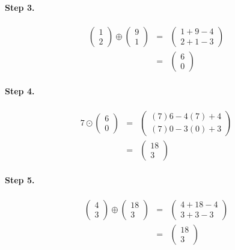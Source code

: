\documentclass[11pt]{article}
\begin{document}
\paragraph{Step 3.}
\begin{eqnarray*}
\begin{pmatrix}
1\\
2
\end{pmatrix}
\oplus
\begin{pmatrix}
9\\
1
\end{pmatrix}
&=&
\begin{pmatrix}
1+9-4\\
2+1-3
\end{pmatrix}
\\&=&
\begin{pmatrix}
6\\
0
\end{pmatrix}
\end{eqnarray*}
\paragraph{Step 4.}
\begin{eqnarray*}
7
\odot
\begin{pmatrix}
6\\
0
\end{pmatrix}
&=&
\begin{pmatrix}
(7)6-4(7)+4\\
(7)0-3(0)+3
\end{pmatrix}
\\&=&
\begin{pmatrix}
18\\
3
\end{pmatrix}
\end{eqnarray*}
\paragraph{Step 5.}
\begin{eqnarray*}
\begin{pmatrix}
4\\
3
\end{pmatrix}
\oplus
\begin{pmatrix}
18\\
3
\end{pmatrix}
&=&
\begin{pmatrix}
4+18-4\\
3+3-3
\end{pmatrix}
\\&=&
\begin{pmatrix}
18\\
3
\end{pmatrix}
\end{eqnarray*}
\end{document}
